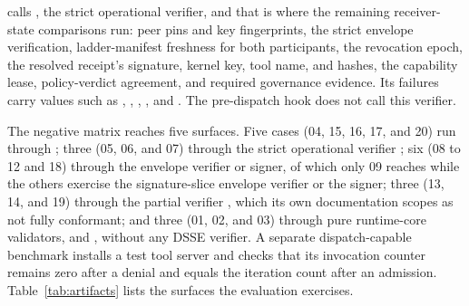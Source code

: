  calls ,
the strict operational verifier, and that is where the remaining
receiver-state comparisons run: peer pins and key fingerprints, the strict
envelope verification, ladder-manifest freshness for both participants, the
revocation epoch, the resolved receipt's signature, kernel key, tool name, and
hashes, the capability lease, policy-verdict agreement, and required
governance evidence. Its failures carry 
values such as ,
, ,
, and
. The pre-dispatch hook does not
call this verifier.

The negative matrix reaches five surfaces. Five cases (04, 15, 16, 17, and
20) run through ; three (05,
06, and 07) through the strict operational verifier
; six (08 to 12 and 18) through
the envelope verifier or signer, of which only 09 reaches
 while the others exercise the
signature-slice envelope verifier or the signer; three (13, 14, and 19)
through the partial verifier ,
which its own documentation scopes as not fully conformant; and three (01,
02, and 03) through pure runtime-core validators,
 and
, without any DSSE verifier. A
separate dispatch-capable benchmark installs a test tool server and checks
that its invocation counter remains zero after a denial and equals the
iteration count after an admission. Table~\ref{tab:artifacts} lists the
surfaces the evaluation exercises.

